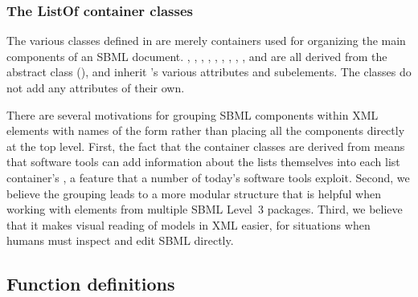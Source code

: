 \subsubsection{The ListOf container classes}
\label{sec:listof}
\label{sec:listofunitdefinitions}
\label{sec:listoffunctiondefinitions}
\label{sec:listofcompartments}
\label{sec:listofspecies}
\label{sec:listofparameters}
\label{sec:listofinitialassignments}
\label{sec:listofinitialassign}
\label{sec:listofrules}
\label{sec:listofconstraints}
\label{sec:listofreactions}
\label{sec:listofevents}

The various \ListOf classes defined in  are
merely containers used for organizing the main components of an
SBML document.  \ListOfFunctionDefinitions,
\ListOfUnitDefinitions, \ListOfCompartments, \ListOfSpecies,
\ListOfParameters, \ListOfInitialAssignments, \ListOfRules,
\ListOfConstraints, \ListOfReactions, and \ListOfEvents are all
derived from the abstract class \SBase (),
and inherit \SBase's various attributes and subelements.  The
\ListOf classes do not add any attributes of their own.

There are several motivations for grouping SBML components within
XML elements with names of the form 
rather than placing all the components directly at the top level.
First, the fact that the container classes are derived from \SBase
means that software tools can add information about the lists
themselves into each list container's \Annotation, a feature that
a number of today's software tools exploit.  Second, we believe
the grouping leads to a more modular structure that is helpful
when working with elements from multiple SBML Level~3 packages.
Third, we believe that it makes visual reading of models in XML
easier, for situations when humans must inspect and edit SBML
directly.


\subsection{Function definitions}
\label{sec:functiondefinition}


